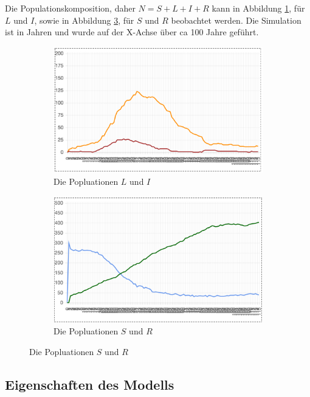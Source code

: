 \documentclass[paper=a4, fontsize=11pt, ngerman, abstract=on]{scrartcl}
\numberwithin{equation}{section} %
\numberwithin{figure}{section} %
\numberwithin{table}{section} %
\begin{document}
Die Populationskomposition, daher $N = S + L + I + R$ kann in Abbildung \ref{fig:l-i-population}, für $L$ und $I$, sowie in Abbildung \ref{fig:s-r-population}, für $S$ und $R$ beobachtet werden. Die Simulation ist in Jahren und wurde auf der X-Achse über ca 100 Jahre geführt.

\begin{figure}[ht]
  \centering
  \begin{subfigure}{.5\textwidth}
    \centering
    \includegraphics[width=.99\linewidth]{images/l-i-population}
    \caption{Die Popluationen $L$ und $I$}
    \label{fig:l-i-population}
  \end{subfigure}%
  \begin{subfigure}{.5\textwidth}
    \centering
    \includegraphics[width=.99\linewidth]{images/s-r-population}
    \caption{Die Popluationen $S$ und $R$}
    \label{fig:s-r-population}
  \end{subfigure}
\end{figure}

\subsection{Eigenschaften des Modells}
\end{document}
